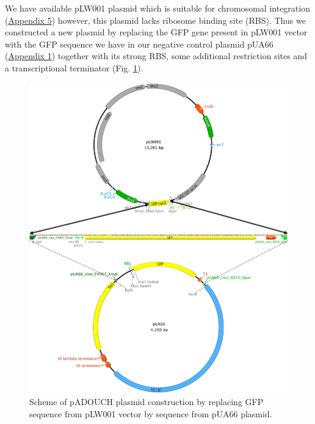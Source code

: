 We have available pLW001 plasmid which is suitable for chromosomal integration (\hyperlink{pLW001}{Appendix 5}) however, this plasmid lacks ribosome binding site (RBS).
Thus we constructed a new plasmid by replacing the GFP gene present in pLW001 vector with the GFP sequence we have in our negative control plasmid pUA66 (\hyperlink{pUA66seq}{Appendix 1}) together with its strong RBS, some additional restriction sites and a transcriptional terminator (Fig. \ref{cloning}).
\begin{figure}[h!]
  \centering
  \includegraphics[scale=0.4]{text/Pictures/Cloning.png}
	\caption{Scheme of pADOUCH plasmid construction by replacing GFP sequence from pLW001 vector by sequence from pUA66 plasmid.}
	\label{cloning}
\end{figure}

